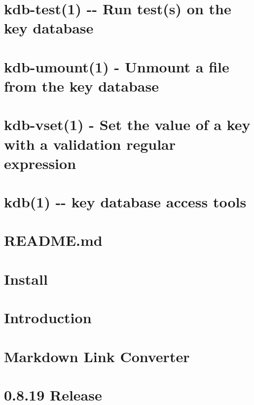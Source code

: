 \documentclass[twoside]{book}
\newcommand{\+}{\discretionary{\mbox{\scriptsize$\hookleftarrow$}}{}{}}
\begin{document}
\chapter{kdb-\/test(1) -\/-\/ Run test(s) on the key database}
\label{md_doc_help_kdb-test}
\hypertarget{md_doc_help_kdb-test}{}

\chapter{kdb-\/umount(1) -\/ Unmount a file from the key database}
\label{md_doc_help_kdb-umount}
\hypertarget{md_doc_help_kdb-umount}{}

\chapter{kdb-\/vset(1) -\/ Set the value of a key with a validation regular expression}
\label{md_doc_help_kdb-vset}
\hypertarget{md_doc_help_kdb-vset}{}

\chapter{kdb(1) -\/-\/ key database access tools}
\label{md_doc_help_kdb}
\hypertarget{md_doc_help_kdb}{}

\chapter{R\+E\+A\+D\+M\+E.\+md}
\label{doc_images_README_md}
\hypertarget{doc_images_README_md}{}

\chapter{Install}
\label{doc_INSTALL_md}
\hypertarget{doc_INSTALL_md}{}

\chapter{Introduction}
\label{doc_LICENSE_md}
\hypertarget{doc_LICENSE_md}{}

\chapter{Markdown Link Converter}
\label{doc_markdownlinkconverter_README_md}
\hypertarget{doc_markdownlinkconverter_README_md}{}

\chapter{0.8.19 Release}
\label{doc_NEWS_md}
\hypertarget{doc_NEWS_md}{}

\end{document}

